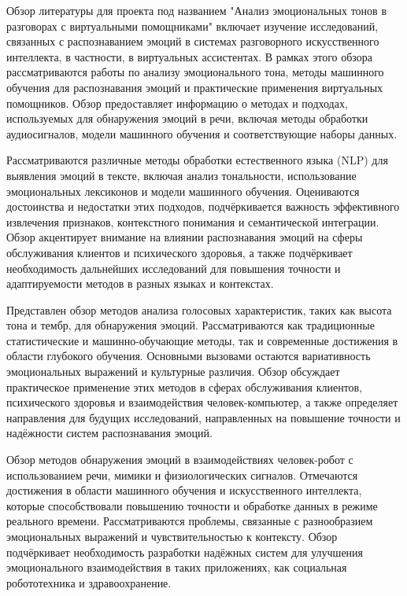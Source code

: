 Обзор литературы для проекта под названием "Анализ эмоциональных тонов в разговорах с виртуальными помощниками" включает изучение исследований, связанных с распознаванием эмоций в системах разговорного искусственного интеллекта, в частности, в виртуальных ассистентах. В рамках этого обзора рассматриваются работы по анализу эмоционального тона, методы машинного обучения для распознавания эмоций и практические применения виртуальных помощников. Обзор предоставляет информацию о методах и подходах, используемых для обнаружения эмоций в речи, включая методы обработки аудиосигналов, модели машинного обучения и соответствующие наборы данных.


 Рассматриваются различные методы обработки естественного языка (NLP) для выявления эмоций в тексте, включая анализ тональности, использование эмоциональных лексиконов и модели машинного обучения. Оцениваются достоинства и недостатки этих подходов, подчёркивается важность эффективного извлечения признаков, контекстного понимания и семантической интеграции. Обзор акцентирует внимание на влиянии распознавания эмоций на сферы обслуживания клиентов и психического здоровья, а также подчёркивает необходимость дальнейших исследований для повышения точности и адаптируемости методов в разных языках и контекстах.
	
 Представлен обзор методов анализа голосовых характеристик, таких как высота тона и тембр, для обнаружения эмоций. Рассматриваются как традиционные статистические и машинно-обучающие методы, так и современные достижения в области глубокого обучения. Основными вызовами остаются вариативность эмоциональных выражений и культурные различия. Обзор обсуждает практическое применение этих методов в сферах обслуживания клиентов, психического здоровья и взаимодействия человек-компьютер, а также определяет направления для будущих исследований, направленных на повышение точности и надёжности систем распознавания эмоций.
	
 Обзор методов обнаружения эмоций в взаимодействиях человек-робот с использованием речи, мимики и физиологических сигналов. Отмечаются достижения в области машинного обучения и искусственного интеллекта, которые способствовали повышению точности и обработке данных в режиме реального времени. Рассматриваются проблемы, связанные с разнообразием эмоциональных выражений и чувствительностью к контексту. Обзор подчёркивает необходимость разработки надёжных систем для улучшения эмоционального взаимодействия в таких приложениях, как социальная робототехника и здравоохранение.
	
